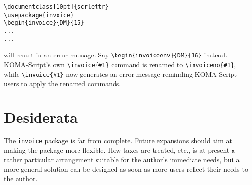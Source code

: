 \documentclass[11pt]{ltxdoc}
\begin{document}
\begin{verbatim}
\documentclass[10pt]{scrlettr}
\usepackage{invoice}
\begin{invoice}{DM}{16}
...
...
\end{verbatim}

will result in an error message. Say \verb-\begin{invoiceenv}{DM}{16}-
instead.  KOMA-Script's own \verb-\invoice{#1}- command is renamed to
\verb-\invoiceno{#1}-, while \verb-\invoice{#1}- now generates an 
error message reminding KOMA-Script users to apply the renamed
commands.

\section{Desiderata}

The \verb-invoice- package is far from complete. Future expansions
should aim at making the package more flexible. How taxes are
treated, etc., is at present a rather particular arrangement
suitable for the author's immediate needs, but a more general
solution can be designed as soon as more users reflect their needs
to the author.
\end{document}
